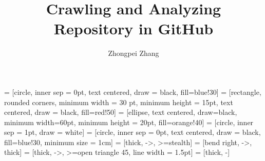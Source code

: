 \documentclass[12pt,oneside,final]{vlsithesis}
\title{Crawling and Analyzing Repository in GitHub}
\author{Zhongpei Zhang}
\begin{document}
\maketitle
\makeapproval
{}
\setcounter{page}{3}

 = [circle, inner sep = 0pt, text centered, draw = black, fill=blue!30]
 = [rectangle, rounded corners, minimum width = 30 pt, minimum height = 15pt, text centered, draw = black,  fill=red!50]
 = [ellipse, text centered, draw=black, minimum width=60pt, minimum height = 20pt, fill=orange!40]
 = [circle, inner sep = 1pt, draw = white]
 = [circle, inner sep = 0pt, text centered, draw = black, fill=blue!30,  minimum size = 1cm]
 = [thick, ->, >=stealth]
 = [bend right, ->, thick]
 = [thick, ->, >=open triangle 45, line width = 1.5pt]
 = [thick, -]

\makedeclaration
\end{document}
